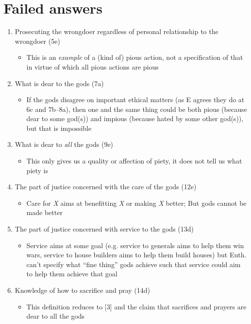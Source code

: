 \documentclass[11pt]{article}
\begin{document}
\section*{Failed answers}
\begin{enumerate}

\item Prosecuting the wrongdoer regardless of personal relationship to the wrongdoer (5e)

\begin{itemize}\item{This is an \emph{example} of a (kind of) pious action, not a specification of that in virtue of which all pious actions are pious}\end{itemize}

\item{What is dear to the gods (7a)}

\begin{itemize}\item{If the gods disagree on important ethical matters (as E agrees they do at 6c and 7b--8a), then one and the same thing could be both pious (because dear to some god(s)) and impious (because hated by some other god(s)), but that is impossible}\end{itemize}

\item{What is dear to \emph{all} the gods (9e)}

\begin{itemize}\item{This only gives us a quality or affection of piety, it does not tell us what piety is}\end{itemize}

\item{The part of justice concerned with the care of the gods (12e)}

\begin{itemize}\item{Care for \emph{X} aims at benefitting \emph{X} or making \emph{X} better; But gods cannot be made better}\end{itemize}

\item{The part of justice concerned with service to the gods (13d)}

\begin{itemize}\item{Service aims at some goal (e.g. service to generals aims to help them win wars, service to house builders aims to help them build houses) but Euth. can't specify what ``fine thing'' gods achieve such that service could aim to help them achieve that goal}\end{itemize} 

\item{Knowledge of how to sacrifice and pray (14d)}

\begin{itemize}\item{This definition reduces to [3] and the claim that sacrifices and prayers are dear to all the gods}\end{itemize}

\end{enumerate}
\end{document}
